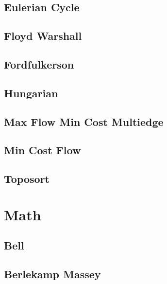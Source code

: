 \documentclass[10pt,portrait,twocolumn,a4paper,notitlepage]{article}
\newcommand\cppfile[2][]{%
\ifstrempty{#1}{}{}%
}
\begin{document}
\subsection{Eulerian Cycle}
\cppfile{grafos_clean/eulerian_cycle.cpp}

\subsection{Floyd Warshall}
\cppfile{grafos_clean/floyd_warshall.cpp}

\subsection{Fordfulkerson}
\cppfile{grafos_clean/FordFulkerson.cpp}

\subsection{Hungarian}
\cppfile{grafos_clean/hungarian.cpp}

\subsection{Max Flow Min Cost Multiedge}
\cppfile{grafos_clean/max_flow_min_cost_multiedge.cpp}

\subsection{Min Cost Flow}
\cppfile{grafos_clean/min_cost_flow.cpp}

\subsection{Toposort}
\cppfile{grafos_clean/toposort.cpp}


\section{Math}

\subsection{Bell}
\cppfile{math_clean/bell.cpp}

\subsection{Berlekamp Massey}
\cppfile{math_clean/berlekamp_massey.cpp}
\end{document}
